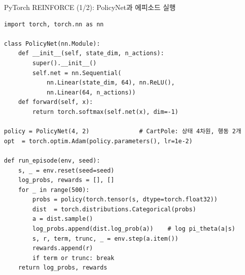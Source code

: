 \begin{frame}[fragile]{PyTorch REINFORCE (1/2): PolicyNet과 에피소드 실행}
  
\begin{lstlisting}
import torch, torch.nn as nn

class PolicyNet(nn.Module):
    def __init__(self, state_dim, n_actions):
        super().__init__()
        self.net = nn.Sequential(
            nn.Linear(state_dim, 64), nn.ReLU(),
            nn.Linear(64, n_actions))
    def forward(self, x):
        return torch.softmax(self.net(x), dim=-1)

policy = PolicyNet(4, 2)              # CartPole: 상태 4차원, 행동 2개
opt  = torch.optim.Adam(policy.parameters(), lr=1e-2)

def run_episode(env, seed):
    s, _ = env.reset(seed=seed)
    log_probs, rewards = [], []
    for _ in range(500):
        probs = policy(torch.tensor(s, dtype=torch.float32))
        dist  = torch.distributions.Categorical(probs)
        a = dist.sample()
        log_probs.append(dist.log_prob(a))    # log pi_theta(a|s)
        s, r, term, trunc, _ = env.step(a.item())
        rewards.append(r)
        if term or trunc: break
    return log_probs, rewards
\end{lstlisting}

\end{frame}
